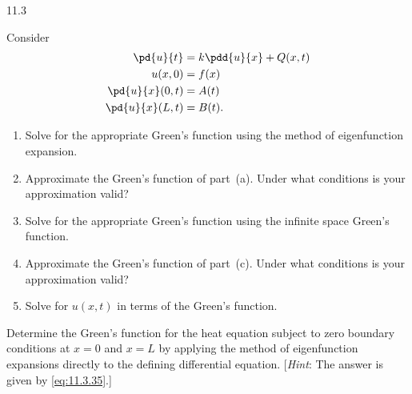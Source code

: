 \begin{exercises}{11.3}
\item \label{ex:11.3.5}
Consider
\begin{align*}
\pd{u}{t} &= k\pdd{u}{x} + Q(x,t) \\
u(x,0) &= f(x) \\
\pd{u}{x}(0,t) &= A(t) \\
\pd{u}{x}(L,t) &= B(t).
\end{align*}
\begin{enumerate}
\item[(a)] Solve for the appropriate Green's function using the method of eigenfunction expansion.
\item[(b)] Approximate the Green's function of part~(a).  Under what conditions is your approximation valid?
\item[(c)] Solve for the appropriate Green's function using the infinite space Green's function.
\item[(d)] Approximate the Green's function of part~(c).  Under what conditions is your approximation valid?
\item[(e)] Solve for $u(x,t)$ in terms of the Green's function.
\end{enumerate}

\item \label{ex:11.3.6}
Determine the Green's function for the heat equation subject to zero boundary conditions at $x = 0$ and $x = L$ by applying the method of eigenfunction expansions directly to the defining differential equation.  [\emph{Hint}: The answer is given by \eqref{eq:11.3.35}.]

\end{exercises}

